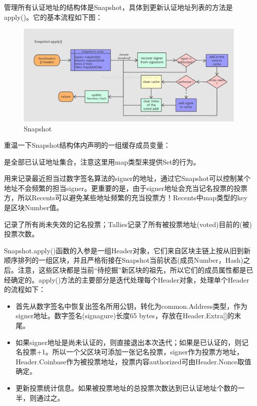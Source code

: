 \documentclass[UTF8]{ctexart}
\begin{document}
{管理所有认证地址的结构体是Snapshot，具体到更新认证地址列表的方法是apply()。它的基本流程如下图：

\begin{figure}
	\centering
	\includegraphics[scale=0.3]{snapshot.png}
	\caption{Snapshot}
	\label{snapshot}
\end{figure}

重温一下Snapshot结构体内声明的一组缓存成员变量：

是全部已认证地址集合，注意这里用map类型来提供Set的行为。

用来记录最近担当过数字签名算法的signer的地址，通过它Snapshot可以控制某个地址不会频繁的担当signer。更重要的是，由于signer地址会充当记名投票的投票方，所以Recents可以避免某些地址频繁的充当投票方！Recents中map类型的key是区块Number值。

记录了所有尚未失效的记名投票；Tallies记录了所有被投票地址(voted)目前的(被)投票次数。

Snapshot.apply()函数的入参是一组Header对象，它们来自区块主链上按从旧到新顺序排列的一组区块，并且严格衔接在Snapshot当前状态(成员Number，Hash)之后。注意，这些区块都是当前“待挖掘”新区块的祖先，所以它们的成员属性都是已经确定的。apply()方法的主要部分是迭代处理每个Header对象，处理单个Header的流程如下：

\begin{itemize}

\item 首先从数字签名中恢复出签名所用公钥，转化为common.Address类型，作为signer地址。数字签名(signagure)长度65 bytes，存放在Header.Extra[]的末尾。

\item 如果signer地址是尚未认证的，则直接退出本次迭代；如果是已认证的，则记名投票+1。所以一个父区块可添加一张记名投票，signer作为投票方地址，Header.Coinbase作为被投票地址，投票内容authorized可由Header.Nonce取值确定。

\item 更新投票统计信息。如果被投票地址的总投票次数达到已认证地址个数的一半，则通过之。


\end{itemize}}
\end{document}
